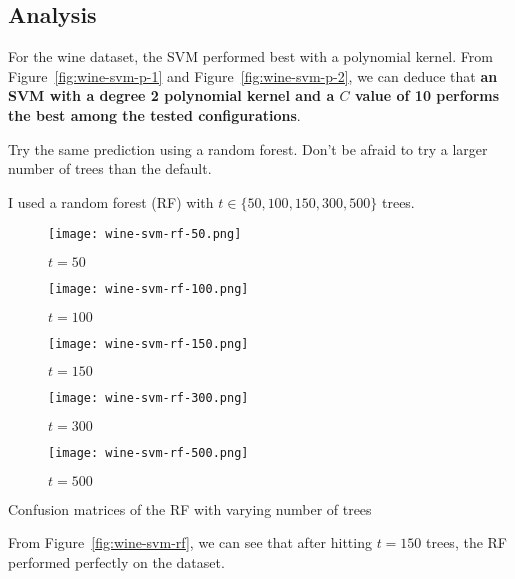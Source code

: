 \documentclass[
  coursecode={CMPE 251},
  assignmentname={Exercise \exercisenumber},
  studentnumber=20053722,
  name={Bryan Hoang},
  draft,
]{
  ltxanswer%
}
\begin{document}
\begin{questions}
\begin{solution}
      \section*{Analysis}
      For the wine dataset, the SVM performed best with a polynomial kernel. From Figure~\ref{fig:wine-svm-p-1} and Figure~\ref{fig:wine-svm-p-2}, we can deduce that \textbf{an SVM with a degree 2 polynomial kernel and a \(C\) value of 10 performs the best among the tested configurations}.
    \end{solution}

    \newpage

    \question[2]{}
    Try the same prediction using a random forest. Don't be afraid to try a larger number of trees than the default.
    \begin{solution}
      I used a random forest (RF) with \(t\in\{50, 100, 150, 300, 500\}\) trees.
      \begin{answerfigure}
        \begin{subfigure}{0.49\textwidth}
          \texttt{[image: wine-svm-rf-50.png]}
          \caption{\(t=50\)}
        \end{subfigure}
        \begin{subfigure}{0.49\textwidth}
          \texttt{[image: wine-svm-rf-100.png]}
          \caption{\(t=100\)}
        \end{subfigure}
        \par\bigskip
        \begin{subfigure}{0.49\textwidth}
          \texttt{[image: wine-svm-rf-150.png]}
          \caption{\(t=150\)}
        \end{subfigure}
        \begin{subfigure}{0.49\textwidth}
          \texttt{[image: wine-svm-rf-300.png]}
          \caption{\(t=300\)}
        \end{subfigure}
        \par\bigskip
        \begin{subfigure}{0.49\textwidth}
          \texttt{[image: wine-svm-rf-500.png]}
          \caption{\(t=500\)}
        \end{subfigure}
        \caption{Confusion matrices of the RF with varying number of trees}
        \label{fig:wine-svm-rf}
      \end{answerfigure}
      From Figure~\ref{fig:wine-svm-rf}, we can see that after hitting \(t=150\) trees, the RF performed perfectly on the dataset.
    \end{solution}
  \end{questions}
\end{document}
